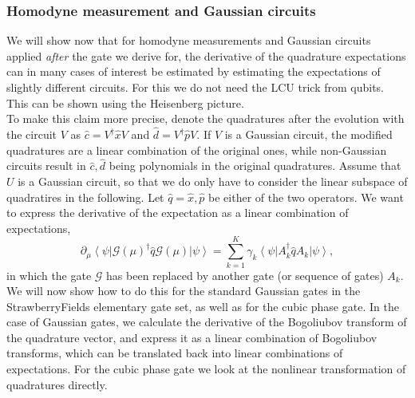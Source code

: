 \documentclass[aps,pra,10pt,twocolumn,groupedaddress,nofootinbib]{revtex4-1}
\theoremstyle{plain}
\newcommand{\ket}[1]{\ensuremath{\left| #1 \right \rangle}}
\newcommand{\bra}[1]{\ensuremath{\left \langle #1 \right |}}
\newcommand{\x}{\hat{x}}
\newcommand{\p}{\hat{p}}
\renewcommand{\c}{\hat{c}}
\renewcommand{\d}{\hat{d}}
\newcommand{\G}{\mathcal{G}}
\begin{document}
\subsubsection{Homodyne measurement and Gaussian circuits}

We will show now that for homodyne measurements and Gaussian circuits applied \textit{after} the gate we derive for, the derivative of the quadrature expectations can in many cases of interest be estimated by estimating the expectations of slightly different circuits. For this we do not need the LCU trick from qubits. This can be shown using the Heisenberg picture. \\


To make this claim more precise, denote the quadratures after the evolution with the circuit $V$ as $\c = V^{\dagger} \x V$ and $\d = V^{\dagger} \p V$. If $V$ is a Gaussian circuit, the modified quadratures are a linear combination of the original ones, while non-Gaussian circuits result in $\c, \d$ being polynomials in the original quadratures. Assume that $U$ is a Gaussian circuit, so that we do only have to consider the linear subspace of quadratires in the following. Let $\hat{q} = \x, \p$ be either of the two operators. We want to express the derivative of the expectation as a linear combination of expectations,
\begin{equation}
	\partial_{\mu}\bra{\psi} \G(\mu)^{\dagger} \hat{q} \G(\mu) \ket{\psi} = \sum_{k=1}^K \gamma_k \bra{\psi} A_k^{\dagger} \hat{q} A_k \ket{\psi},
	\label{Eq:sumofsympl}
\end{equation}
in which the gate $\G$ has been replaced by another gate (or sequence of gates) $A_k$. \\

We will now show how to do this for the standard Gaussian gates in the StrawberryFields elementary gate set, as well as for the cubic phase gate. In the case of Gaussian gates, we calculate the derivative of the Bogoliubov transform of the quadrature vector, and express it as a linear combination of Bogoliubov transforms, which can be translated back into linear combinations of expectations. For the cubic phase gate we look at the nonlinear transformation of quadratures directly.\\
\end{document}
